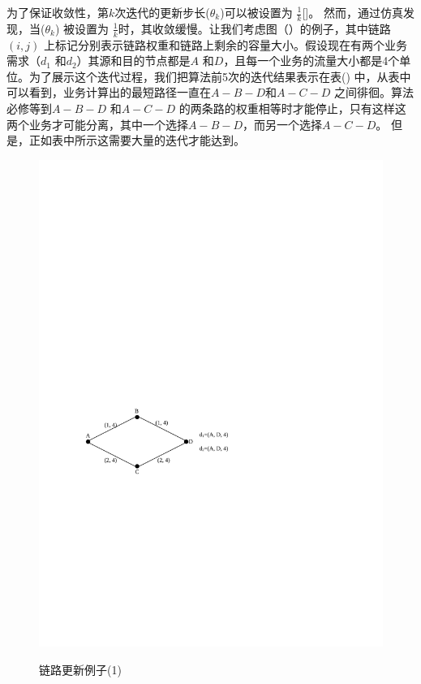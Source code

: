 为了保证收敛性，第$k$次迭代的更新步长($\theta_k$)可以被设置为 $\frac{1}{k}$[]。 然而，通过仿真发现，当($\theta_k$) 被设置为 $\frac{1}{k}$时，其收敛缓慢。让我们考虑图（）的例子，其中链路$(i,j)$ 上标记分别表示链路权重和链路上剩余的容量大小。假设现在有两个业务需求（$d_1$ 和$d_2$）其源和目的节点都是$A$ 和$D$，且每一个业务的流量大小都是4个单位。为了展示这个迭代过程，我们把算法前5次的迭代结果表示在表() 中，从表中可以看到，业务计算出的最短路径一直在$A-B-D$和$A-C-D$ 之间徘徊。算法必修等到$A-B-D$ 和$A-C-D$ 的两条路的权重相等时才能停止，只有这样这两个业务才可能分离，其中一个选择$A-B-D$，而另一个选择$A-C-D$。 但是，正如表中所示这需要大量的迭代才能达到。
\begin{figure}
\setlength{\belowcaptionskip}{-0.1cm}
  \begin{center}
    {\includegraphics[width=0.4 \textwidth]{figures/IterNum.pdf}}
    \end{center}
  \caption{{\footnotesize{链路更新例子(1)}}}
  \label{u1}
\end{figure}
